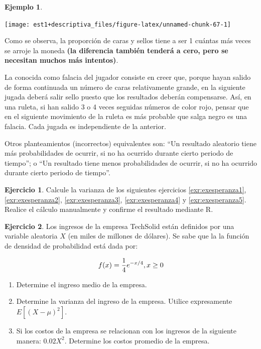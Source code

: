 \documentclass[
  11pt,
]{book}
\providecommand{\tightlist}{%
  \setlength{\itemsep}{0pt}\setlength{\parskip}{0pt}}
\theoremstyle{definition}
\theoremstyle{definition}
\newtheorem{example}{Ejemplo}[chapter]
\theoremstyle{definition}
\newtheorem{exercise}{Ejercicio}[chapter]
\theoremstyle{definition}
\theoremstyle{remark}
\begin{document}
\begin{example}
\begin{center}\texttt{[image: est1+descriptiva\_files/figure-latex/unnamed-chunk-67-1]} \end{center}

Como se observa, la proporción de caras y sellos tiene a ser 1 cuántas más veces se arroje la moneda \textbf{(la diferencia también tenderá a cero, pero se necesitan muchos más intentos)}.

La conocida como falacia del jugador consiste en creer que, porque hayan salido de forma continuada un número de caras relativamente grande, en la siguiente jugada deberá salir sello puesto que los resultados deberán compensarse. Así, en una ruleta, si han salido 3 o 4 veces seguidas números de color rojo, pensar que en el siguiente movimiento de la ruleta es más probable que salga negro es una falacia. Cada jugada es independiente de la anterior.

Otros planteamientos (incorrectos) equivalentes son: ``Un resultado aleatorio tiene más probabilidades de ocurrir, si no ha ocurrido durante cierto periodo de tiempo''; o ``Un resultado tiene menos probabilidades de ocurrir, si no ha ocurrido durante cierto periodo de tiempo''.
\end{example}

\begin{exercise}
Calcule la varianza de los siguientes ejercicios \ref{exr:exesperanza1}, \ref{exr:exesperanza2}, \ref{exr:exesperanza3}, \ref{exr:exesperanza4} y \ref{exr:exesperanza5}. Realice el cálculo manualmente y confirme el resultado mediante R.
\end{exercise}

\begin{exercise}

Los ingresos de la empresa TechSolid están definidos por una variable aleatoria \(X\) (en miles de millones de dólares). Se sabe que la la función de densidad de probabilidad está dada por:

\begin{equation}
\notag
f(x) = \frac{1}{4} e^{-x/4},  x \geq 0
\end{equation}

\begin{enumerate}
\def\labelenumi{\arabic{enumi}.}
\tightlist
\item
  Determine el ingreso medio de la empresa.
\item
  Determine la varianza del ingreso de la empresa. Utilice expresamente \(E[(X-\mu)^2]\).
\item
  Si los costos de la empresa se relacionan con los ingresos de la siguiente manera: \(0.02X^2\). Determine los costos promedio de la empresa.
\end{enumerate}

\end{exercise}
\end{document}
